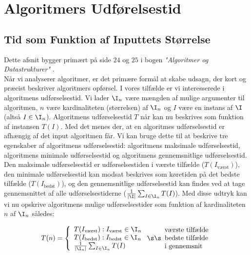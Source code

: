 \chapter{Algoritmers Udførelsestid}
\label{ch:Algoritmers Udførelsestid}

\section{Tid som Funktion af Inputtets Størrelse}
\label{sec:Tid som Funktion af Argumentets Kardinalitet}

Dette afsnit bygger primært på side $24$ og $25$ i bogen \emph{"Algoritmer og Datastrukturer"} \cite{aogd}.\\

Når vi analyserer algoritmer, er det primære formål at skabe udsagn, der kort og præcist beskriver algoritmers opførsel. I vores tilfælde er vi interesserede i algoritmens udførselsestid. Vi lader $\I _n$ være mængden af mulige argumenter til algoritmen, $n$ være kardinaliteten (størrelsen) af $\I _n$ og $I$ være en instans af $\I$ (altså $I \in \I _n$). Algoritmens udførselsestid $T$ når kan nu beskrives som funktion af instansen $T(I)$. Med det menes der, at en algoritmes udførselsestid er afhængig af det input algoritmen får. Vi kan bruge dette til at beskrive tre egenskaber af algoritmens udførselsestid: algoritmens maksimale udførselsestid, algoritmens minimale udførselsestid og algoritmens gennemsnitlige udførselsestid. Den maksimale udførselsestid er udførselsestiden i værste tilfælde ($T(I_{\text{værst}})$), den minimale udførselsestid kan modsat beskrives som køretiden på det bedste tilfælde ($T(I_{\text{bedst}})$), og den gennemsnitlige udførselsestid kan findes ved at tage gennemsnittet af alle udførselsestiderne ($\frac{1}{|\I |} \sum_{I \in \I _n}T(I)$). Med disse udtryk kan vi nu opskrive algoritmens mulige udførselsestider som funktion af kardinaliteten $n$ af $\I _n$ således:

\[ T(n) = \left\{ \begin{array}{l}
	T(I_{\text{værst}}): I_{\text{værst}} \in \I _n  \\
	T(I_{\text{bedst}}): I_{\text{bedst}} \in \I _n  \\
	\frac{1}{|\I _n|} \sum_{I \in \I _n}T(I)
\end{array} \right.\s\s\begin{array}{l}
	\text{værste tilfælde}\\
	\text{bedste tilfælde}\\
	\text{i gennemsnit}
\end{array}\]

